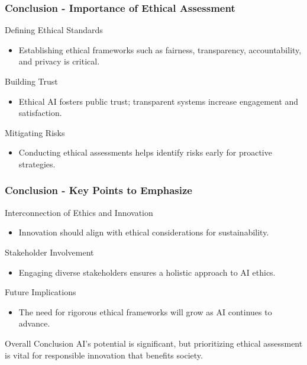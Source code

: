 \documentclass[aspectratio=169]{beamer}
\begin{document}
\begin{frame}[fragile]
    \frametitle{Conclusion - Importance of Ethical Assessment}
    \begin{block}{Defining Ethical Standards}
        \begin{itemize}
            \item Establishing ethical frameworks such as fairness, transparency, accountability, and privacy is critical.
        \end{itemize}
    \end{block}
    
    \begin{block}{Building Trust}
        \begin{itemize}
            \item Ethical AI fosters public trust; transparent systems increase engagement and satisfaction.
        \end{itemize}
    \end{block}
    
    \begin{block}{Mitigating Risks}
        \begin{itemize}
            \item Conducting ethical assessments helps identify risks early for proactive strategies.
        \end{itemize}
    \end{block}
\end{frame}

\begin{frame}[fragile]
    \frametitle{Conclusion - Key Points to Emphasize}
    \begin{block}{Interconnection of Ethics and Innovation}
        \begin{itemize}
            \item Innovation should align with ethical considerations for sustainability.
        \end{itemize}
    \end{block}

    \begin{block}{Stakeholder Involvement}
        \begin{itemize}
            \item Engaging diverse stakeholders ensures a holistic approach to AI ethics.
        \end{itemize}
    \end{block}

    \begin{block}{Future Implications}
        \begin{itemize}
            \item The need for rigorous ethical frameworks will grow as AI continues to advance.
        \end{itemize}
    \end{block}
    
    \begin{block}{Overall Conclusion}
        AI's potential is significant, but prioritizing ethical assessment is vital for responsible innovation that benefits society.
    \end{block}
\end{frame}
\end{document}
